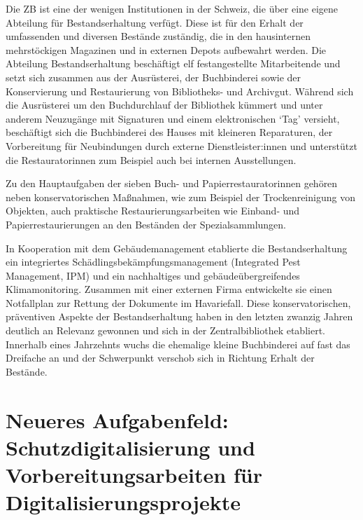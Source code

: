 \documentclass[a4paper,
fontsize=11pt,
oneside,
numbers=noperiodatend,
parskip=half-,
bibliography=totoc,
final
]{scrartcl}
\begin{document}
Die ZB ist eine der wenigen Institutionen in der Schweiz, die über eine
eigene Abteilung für Bestandserhaltung verfügt. Diese ist für den Erhalt
der umfassenden und diversen Bestände zuständig, die in den hausinternen
mehrstöckigen Magazinen und in externen Depots aufbewahrt werden. Die
Abteilung Bestandserhaltung beschäftigt elf festangestellte
Mitarbeitende und setzt sich zusammen aus der Ausrüsterei, der
Buchbinderei sowie der Konservierung und Restaurierung von Bibliotheks-
und Archivgut. Während sich die Ausrüsterei um den Buchdurchlauf der
Bibliothek kümmert und unter anderem Neuzugänge mit Signaturen und einem
elektronischen \enquote*{Tag} versieht, beschäftigt sich die
Buchbinderei des Hauses mit kleineren Reparaturen, der Vorbereitung für
Neubindungen durch externe Dienstleister:innen und unterstützt die
Restauratorinnen zum Beispiel auch bei internen Ausstellungen.

Zu den Hauptaufgaben der sieben Buch- und Papierrestauratorinnen gehören
neben konservatorischen Maßnahmen, wie zum Beispiel der Trockenreinigung
von Objekten, auch praktische Restaurierungsarbeiten wie Einband- und
Papierrestaurierungen an den Beständen der Spezialsammlungen.

In Kooperation mit dem Gebäudemanagement etablierte die
Bestandserhaltung ein integriertes Schädlingsbekämpfungsmanagement
(Integrated Pest Management, IPM) und ein nachhaltiges und
gebäudeübergreifendes Klimamonitoring. Zusammen mit einer externen Firma
entwickelte sie einen Notfallplan zur Rettung der Dokumente im
Havariefall. Diese konservatorischen, präventiven Aspekte der
Bestandserhaltung haben in den letzten zwanzig Jahren deutlich an
Relevanz gewonnen und sich in der Zentralbibliothek etabliert. Innerhalb
eines Jahrzehnts wuchs die ehemalige kleine Buchbinderei auf fast das
Dreifache an und der Schwerpunkt verschob sich in Richtung Erhalt der
Bestände.

\section{Neueres Aufgabenfeld: Schutzdigitalisierung und
Vorbereitungsarbeiten für
Digitalisierungsprojekte}\label{neueres-aufgabenfeld-schutzdigitalisierung-und-vorbereitungsarbeiten-fuxfcr-digitalisierungsprojekte}
\end{document}
